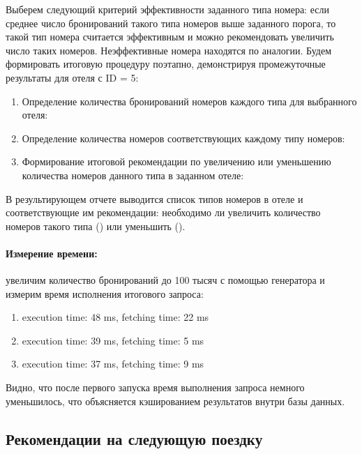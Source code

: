 Выберем следующий критерий эффективности заданного типа номера: если среднее число бронирований такого типа номеров выше заданного порога, то такой тип номера считается эффективным и можно рекомендовать увеличить число таких номеров. Неэффективные номера находятся по аналогии. Будем формировать итоговую процедуру поэтапно, демонстрируя промежуточные результаты для отеля с ID = 5:
\begin{enumerate}[leftmargin=0em]
	\item Определение количества бронирований номеров каждого типа для выбранного отеля:

	\item Определение количества номеров соответствующих каждому типу номеров:

	\item Формирование итоговой рекомендации по увеличению или уменьшению количества номеров данного типа в заданном отеле:
\end{enumerate}

В результирующем отчете выводится список типов номеров в отеле и соответствующие им рекомендации: необходимо ли увеличить количество номеров такого типа () или уменьшить ().

\paragraph{Измерение времени:} увеличим количество бронирований до 100 тысяч с помощью генератора и измерим время исполнения итогового запроса:

\begin{enumerate}
	\item execution time: 48 ms, fetching time: 22 ms
	\item execution time: 39 ms, fetching time: 5 ms
	\item execution time: 37 ms, fetching time: 9 ms
\end{enumerate}

Видно, что после первого запуска время выполнения запроса немного уменьшилось, что объясняется кэшированием результатов внутри базы данных.

\newpage

\subsection{Рекомендации на следующую поездку}

